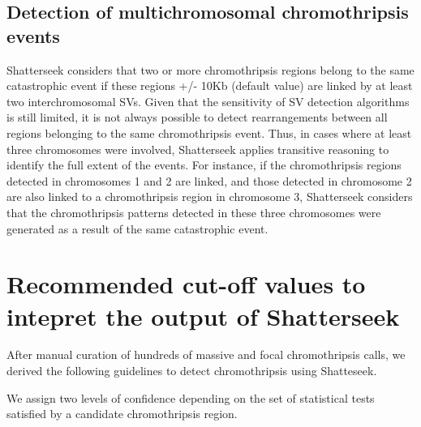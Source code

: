 \documentclass[twoside,a4wide,11pt]{article}\usepackage[]{graphicx}\usepackage[]{color}
\begin{document}
\subsection{Detection of multichromosomal chromothripsis events}
Shatterseek considers that two or more  chromothripsis regions belong to the same 
catastrophic event if these regions +/- 10Kb (default value) are linked by at least two interchromosomal SVs.
Given that the sensitivity of SV detection algorithms is still limited,
it is not always possible to detect rearrangements between all regions belonging to the same chromothripsis event.
Thus, in cases where at least three chromosomes were involved, 
Shatterseek applies transitive reasoning to identify the full extent of the events. 
For instance, if the chromothripsis regions detected in chromosomes 1 and 2 are linked, and those detected in chromosome 2 are also linked to a chromothripsis region in chromosome 3, Shatterseek considers that the chromothripsis patterns detected in these three chromosomes were generated as a result of the same catastrophic event.



\section{Recommended cut-off values to intepret the output of Shatterseek}

After manual curation of hundreds of massive and focal chromothripsis calls, 
we derived the following guidelines to detect chromothripsis using Shatteseek.

We assign two levels of confidence depending on the set of statistical tests
satisfied by a candidate chromothripsis region.
\end{document}
